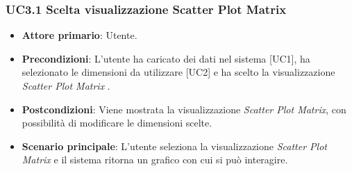 \subsubsection{UC3.1 Scelta visualizzazione Scatter Plot Matrix}
\begin{itemize}
	\item \textbf{Attore primario}: Utente.
	\item \textbf{Precondizioni}: L'utente ha caricato dei dati nel sistema [UC1], ha selezionato le dimensioni da utilizzare [UC2] e ha scelto la visualizzazione \textit{Scatter Plot Matrix} .
	\item \textbf{Postcondizioni}: Viene mostrata la visualizzazione \textit{Scatter Plot Matrix}, con possibilità di modificare le dimensioni scelte.
	\item \textbf{Scenario principale}: L'utente seleziona la visualizzazione \textit{Scatter Plot Matrix} e il sistema ritorna un grafico con cui si può interagire.
\end{itemize}
